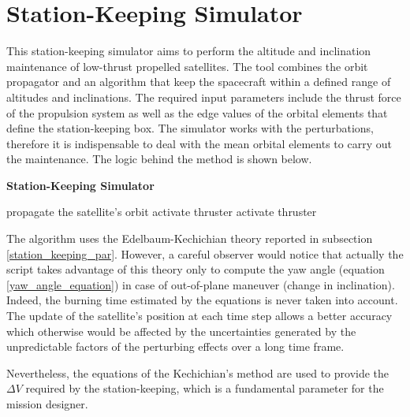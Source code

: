 \section{Station-Keeping Simulator}
This station-keeping simulator aims to perform the altitude and inclination maintenance of low-thrust propelled satellites.
The tool combines the orbit propagator and an algorithm that keep the spacecraft within a defined range of altitudes and inclinations.
The required input parameters include the thrust force of the propulsion system as well as the edge values of the orbital elements that define the station-keeping box.
The simulator works with the perturbations, therefore it is indispensable to deal with the mean orbital elements to carry out the maintenance.
The logic behind the method is shown below.
\begin{algorithm}[H]
      \caption{\textbf{Station-Keeping Simulator}}
      \begin{algorithmic}[1]
                        \State propagate the satellite's orbit
                                \State activate thruster
                            \EndWhile
                        \EndIf           
                                \State activate thruster
                            \EndWhile
                    \EndIf
                  \EndFor
            \EndProcedure
      \end{algorithmic}
\end{algorithm}
The algorithm uses the Edelbaum-Kechichian theory reported in subsection \ref{station_keeping_par}.
However, a careful observer would notice that actually the script takes advantage of this theory only to compute the yaw angle (equation \ref{yaw_angle_equation}) in case of out-of-plane maneuver (change in inclination).
Indeed, the burning time estimated by the equations is never taken into account.
The update of the satellite's position at each time step allows a better accuracy which otherwise would be affected by the uncertainties generated by the unpredictable factors of the perturbing effects over a long time frame.

Nevertheless, the equations of the Kechichian's method are used to provide the $\Delta V$ required by the station-keeping, which is a fundamental parameter for the mission designer.



